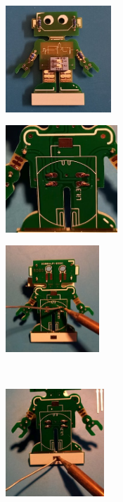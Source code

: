 \documentclass[a4paper]{article}
\begin{document}
\ \\
\begin{minipage}[t]{0.33\textwidth}
  \centering
  \includegraphics[height=4cm]{../pictures/Switch1.jpg}
  \label{img:Resistor1}
  \end{minipage}
\begin{minipage}[t]{0.33\textwidth}
  \centering
  \includegraphics[height=4cm]{../pictures/Switch2.jpg}
  \label{img:Switch2}
\end{minipage}
\begin{minipage}[t]{0.33\textwidth}
  \centering
  \includegraphics[height=4cm]{../pictures/Switch3.jpg}
  \label{img:Switch3}
\end{minipage}
\ \\
\begin{minipage}[t]{0.33\textwidth}
  \centering
  \includegraphics[height=4cm]{../pictures/Bat1.jpg}
  \label{img:Bat1}
  \end{minipage}
\end{document}
